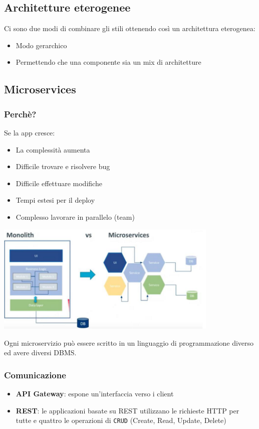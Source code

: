\documentclass[12pt, a4paper]{report}
\begin{document}
\subsection{Architetture eterogenee}
Ci sono due modi di combinare gli stili ottenendo così un architettura eterogenea:
\begin{itemize}
    \item Modo gerarchico
    \item Permettendo che una componente sia un mix di architetture
\end{itemize}
\subsection{Microservices}
\subsubsection{Perchè?}
Se la app cresce:
\begin{itemize}
    \item La complessità aumenta
    \item Difficile trovare e risolvere bug
    \item Difficile effettuare  modifiche
    \item Tempi estesi per il deploy
    \item Complesso lavorare in parallelo (team)
\end{itemize}
\begin{center}
    \includegraphics[width=0.8\textwidth]{Immagini/monolithvsmicroservice.png}
\end{center}
Ogni microservizio può essere scritto in un linguaggio di programmazione diverso ed avere diversi DBMS.
\subsubsection{Comunicazione}
\begin{itemize}
    \item \textbf{API Gateway}: espone un'interfaccia verso i client
    \item \textbf{REST}: le applicazioni basate su REST utilizzano le richieste HTTP per tutte e quattro le operazioni di \texttt{CRUD} (Create, Read, Update, Delete)
\end{itemize}
\end{document}
